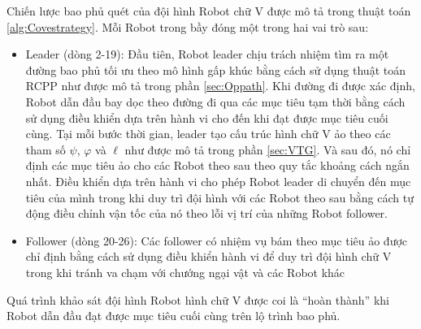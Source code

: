 Chiến lược bao phủ quét của đội hình Robot chữ V được mô tả trong thuật toán \ref{alg:Covestrategy}. Mỗi Robot trong bầy đóng một trong hai vai trò sau:
\begin{itemize}
     \item Leader (dòng 2-19): Đầu tiên, Robot leader chịu trách nhiệm tìm ra một đường bao phủ tối ưu theo mô hình gấp khúc bằng cách sử dụng thuật toán RCPP như được mô tả trong phần \ref{sec:Oppath}. Khi đường đi được xác định, Robot dẫn đầu bay dọc theo đường đi qua các mục tiêu tạm thời bằng cách sử dụng điều khiển dựa trên hành vi cho đến khi đạt được mục tiêu cuối cùng. Tại mỗi bước thời gian, leader tạo cấu trúc hình chữ V ảo theo các tham số $\psi$, $\varphi$ và $\ell$ như được mô tả trong phần \ref{sec:VTG}. Và sau đó, nó chỉ định các mục tiêu ảo cho các Robot theo sau theo quy tắc khoảng cách ngắn nhất. Điều khiển dựa trên hành vi cho phép Robot leader di chuyển đến mục tiêu của mình trong khi duy trì đội hình với các Robot theo sau bằng cách tự động điều chỉnh vận tốc của nó theo lỗi vị trí của những Robot follower.
     \item Follower (dòng 20-26): Các follower có nhiệm vụ bám theo mục tiêu ảo được chỉ định bằng cách sử dụng điều khiển hành vi để duy trì đội hình chữ V trong khi tránh va chạm với chướng ngại vật và các Robot khác
\end{itemize}

Quá trình khảo sát đội hình Robot hình chữ V được coi là ``hoàn thành'' khi Robot dẫn đầu đạt được mục tiêu cuối cùng trên lộ trình bao phủ.
